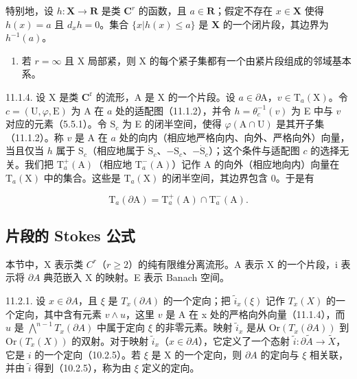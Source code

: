 特别地，设 \(h: \mathbf{X} \to \mathbf{R}\) 是类 \(\mathbf{C}^r\) 的函数，且 \(a \in \mathbf{R}\)；假定不存在 \(x \in \mathbf{X}\) 使得 \(h(x) = a\) 且 \(d_x h = 0\)。集合 \(\{x | h(x) \leqslant a\}\) 是 \(\mathbf{X}\) 的一个闭片段，其边界为 \(h^{-1}(a)\)。

\begin{enumerate}
\def\labelenumi{\alph{enumi})}
\setcounter{enumi}{3}
\tightlist
\item
  若 \(r = \infty\) 且 X 局部紧，则 X 的每个紧子集都有一个由紧片段组成的邻域基本系。
\end{enumerate}

11.1.4. 设 X 是类 \(\mathbf{C}^{\mathrm{r}}\) 的流形，A 是 X 的一个片段。设 \(a \in \partial \mathrm{A}\)，\(v \in \mathrm{T}_a(\mathrm{X})\)。令 \(c = (\mathrm{U}, \varphi, \mathrm{E})\) 为 A 在 \(a\) 处的适配图（11.1.2），并令 \(h = \theta_c^{-1}(v)\) 为 E 中与 \(v\) 对应的元素（5.5.1）。令 \(\mathrm{S}_c\) 为 E 的闭半空间，使得 \(\varphi(\mathrm{A} \cap \mathrm{U})\) 是其开子集（11.1.2）。称 \(v\) 是 A 在 \(a\) 处的向内（相应地严格向内、向外、严格向外）向量，当且仅当 \(h\) 属于 \(\mathrm{S}_c\)（相应地属于 \(\dot{\mathrm{S}}_c\)、\(-\mathrm{S}_c\)、\(-\dot{\mathrm{S}}_c\)）；这个条件与适配图 \(c\) 的选择无关。我们把 \(\mathrm{T}_a^+(\mathrm{A})\)（相应地 \(\mathrm{T}_a^-(\mathrm{A})\)）记作 A 的向外（相应地向内）向量在 \(\mathrm{T}_a(\mathrm{X})\) 中的集合。这些是 \(\mathrm{T}_a(\mathrm{X})\) 的闭半空间，其边界包含 0。于是有

\[
\mathrm{T} _ {a} (\partial \mathrm{A}) = \mathrm{T} _ {a} ^ {+} (\mathrm{A}) \cap \mathrm{T} _ {a} ^ {-} (\mathrm{A}).
\]

\subsection{片段的 Stokes 公式}

本节中，X 表示类 \(C^{r}\)（\(r \geqslant 2\)）的纯有限维分离流形。A 表示 X 的一个片段，i 表示将 \(\partial A\) 典范嵌入 X 的映射。E 表示 Banach 空间。

11.2.1. 设 \(x \in \partial A\)，且 \(\xi\) 是 \(T_x(\partial A)\) 的一个定向；把 \(\tilde{i}_x(\xi)\) 记作 \(T_x(X)\) 的一个定向，其中含有元素 \(v \wedge u\)，这里 \(v\) 是 A 在 x 处的严格向外向量（11.1.4），而 \(u\) 是 \(\bigwedge^{n-1} T_x(\partial A)\) 中属于定向 \(\xi\) 的非零元素。映射 \(\tilde{i}_x\) 是从 \(\text{Or}(T_x(\partial A))\) 到 \(\text{Or}(T_x(X))\) 的双射。对于映射 \(\tilde{i}_x\)（\(x \in \partial A\)），它定义了一个态射 \(\tilde{i} \colon \partial \widetilde{A} \to \widetilde{X}\)，它是 \(i\) 的一个定向（10.2.5）。若 \(\xi\) 是 X 的一个定向，则 \(\partial A\) 的定向与 \(\xi\) 相关联，并由 \(\tilde{i}\) 得到（10.2.5），称为由 \(\xi\) 定义的定向。

